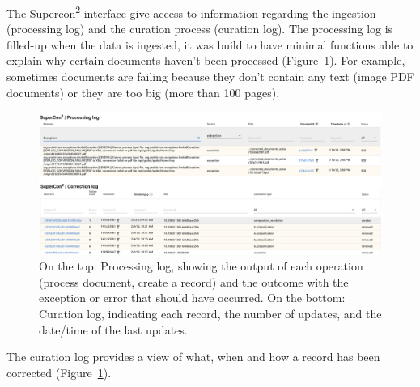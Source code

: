 \documentclass[a4paper]{article}
\begin{document}
The Supercon\textsuperscript{2} interface give access to information regarding the ingestion (processing log) and the curation process (curation log). 
The processing log is filled-up when the data is ingested, it was build to have minimal functions able to explain why certain documents haven't been processed (Figure~\ref{fig:processing-curation-log}). 
For example, sometimes documents are failing because they don't contain any text (image PDF documents) or they are too big (more than 100 pages). 


\begin{figure}[ht]
  \centering
  \includegraphics[width=1\textwidth]{images/processing-curation-log.png} 
  \caption{On the top: Processing log, showing the output of each operation (process document, create a record) and the outcome with the exception or error that should have occurred. On the bottom: Curation log, indicating each record, the number of updates, and the date/time of the last updates.}
  \label{fig:processing-curation-log}
\end{figure}

The curation log provides a view of what, when and how a record has been corrected (Figure~\ref{fig:processing-curation-log}).

\end{document}
